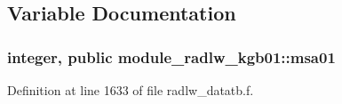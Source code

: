 \subsection{Variable Documentation}
\subsubsection[{\texorpdfstring{msa01}{msa01}}]{\setlength{\rightskip}{0pt plus 5cm}integer, public module\+\_\+radlw\+\_\+kgb01\+::msa01}\hypertarget{namespacemodule__radlw__kgb01_a60db2a67b7f03a52fa88acd2c7874dfc}{}\label{namespacemodule__radlw__kgb01_a60db2a67b7f03a52fa88acd2c7874dfc}


Definition at line 1633 of file radlw\+\_\+datatb.\+f.

